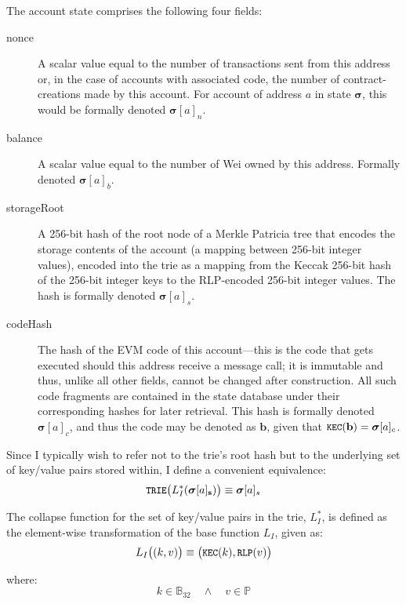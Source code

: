 \documentclass[9pt,oneside]{amsart}
\begin{document}
\begin{multicols}{2}
The account state comprises the following four fields:

\begin{description}
\item[nonce] A scalar value equal to the number of transactions sent from this address or, in the case of accounts with associated code, the number of contract-creations made by this account. For account of address $a$ in state $\boldsymbol{\sigma}$, this would be formally denoted $\boldsymbol{\sigma}[a]_n$.
\item[balance] A scalar value equal to the number of Wei owned by this address. Formally denoted $\boldsymbol{\sigma}[a]_b$.
\item[storageRoot] A 256-bit hash of the root node of a Merkle Patricia tree that encodes the storage contents of the account (a mapping between 256-bit integer values), encoded into the trie as a mapping from the Keccak 256-bit hash of the  256-bit integer keys to the RLP-encoded 256-bit integer values. The hash is formally denoted $\boldsymbol{\sigma}[a]_s$.
\item[codeHash] The hash of the EVM code of this account---this is the code that gets executed should this address receive a message call; it is immutable and thus, unlike all other fields, cannot be changed after construction. All such code fragments are contained in the state database under their corresponding hashes for later retrieval. This hash is formally denoted $\boldsymbol{\sigma}[a]_c$, and thus the code may be denoted as $\mathbf{b}$, given that $\texttt{\small KEC}(\mathbf{b}) = \boldsymbol{\sigma}[a]_c$.
\end{description}

Since I typically wish to refer not to the trie's root hash but to the underlying set of key/value pairs stored within, I define a convenient equivalence:
\begin{equation}
\texttt{\small TRIE}\big(L_I^*(\boldsymbol{\sigma}[a]_\mathbf{s})\big) \equiv \boldsymbol{\sigma}[a]_s
\end{equation}

The collapse function for the set of key/value pairs in the trie, $L_I^*$, is defined as the element-wise transformation of the base function $L_I$, given as:
\begin{equation}
L_I\big( (k, v) \big) \equiv \big(\texttt{\small KEC}(k), \texttt{\small RLP}(v)\big)
\end{equation}

where:
\begin{equation}
k \in \mathbb{B}_{32} \quad \wedge \quad v \in \mathbb{P}
\end{equation}


\end{multicols}
\end{document}
